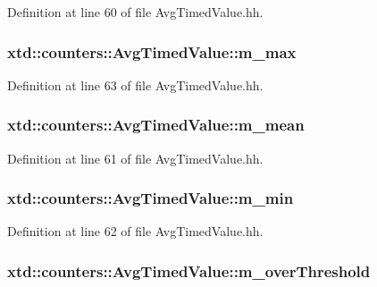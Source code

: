 Definition at line 60 of file Avg\-Timed\-Value.\-hh.

\hypertarget{classxtd_1_1counters_1_1AvgTimedValue_a90ef2640c6d711a3eef2585aaef50afb}{
\subsubsection[{m\-\_\-max}]{ xtd\-::counters\-::\-Avg\-Timed\-Value\-::m\-\_\-max}}\label{classxtd_1_1counters_1_1AvgTimedValue_a90ef2640c6d711a3eef2585aaef50afb}


Definition at line 63 of file Avg\-Timed\-Value.\-hh.

\hypertarget{classxtd_1_1counters_1_1AvgTimedValue_ab0eb52c60a1fe28c6ea148270ca8cc74}{
\subsubsection[{m\-\_\-mean}]{ xtd\-::counters\-::\-Avg\-Timed\-Value\-::m\-\_\-mean}}\label{classxtd_1_1counters_1_1AvgTimedValue_ab0eb52c60a1fe28c6ea148270ca8cc74}


Definition at line 61 of file Avg\-Timed\-Value.\-hh.

\hypertarget{classxtd_1_1counters_1_1AvgTimedValue_aeed066e7062c73d577033308bc0344bf}{
\subsubsection[{m\-\_\-min}]{ xtd\-::counters\-::\-Avg\-Timed\-Value\-::m\-\_\-min}}\label{classxtd_1_1counters_1_1AvgTimedValue_aeed066e7062c73d577033308bc0344bf}


Definition at line 62 of file Avg\-Timed\-Value.\-hh.

\hypertarget{classxtd_1_1counters_1_1AvgTimedValue_a7a91ad83dade8f67c4df8150ddb33060}{
\subsubsection[{m\-\_\-over\-Threshold}]{ xtd\-::counters\-::\-Avg\-Timed\-Value\-::m\-\_\-over\-Threshold}}\label{classxtd_1_1counters_1_1AvgTimedValue_a7a91ad83dade8f67c4df8150ddb33060}


